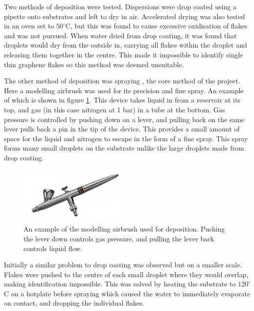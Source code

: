 \documentclass[12pt,titlepage]{article}
\begin{document}
	Two methods of deposition were tested. Dispersions were drop coated using a pipette onto substrates and left to dry in air. Accelerated drying was also tested in an oven set to $50^{\circ}$C, but this was found to cause excessive oxidisation of flakes and was not pursued. When water dried from drop coating, it was found that droplets would dry from the outside in, carrying all flakes within the droplet and releasing them together in the centre. This made it impossible to identify single thin graphene flakes so this method was deemed unsuitable.
	
	The other method of deposition was spraying \cite{Pham2010}, the core method of the project. Here a modelling airbrush was used for its precision and fine spray. An example of which is shown in figure \ref{fig:airbrush}. This device takes liquid in from a reservoir at its top, and gas (in this case nitrogen at 1 bar) in a tube at the bottom. Gas pressure is controlled by pushing down on a lever, and pulling back on the same lever pulls back a pin in the tip of the device. This provides a small amount of space for the liquid and nitrogen to escape in the form of a fine spray. This spray forms many small droplets on the substrate unlike the large droplets made from drop coating.
	
	\begin{figure}
		\centering
		\includegraphics[width=0.5\textwidth]{figures/airbrush.jpg}
		\caption[The modelling airbrush used for deposition.]{An example of the modelling airbrush used for deposition. Pushing the lever down controls gas pressure, and pulling the lever back controls liquid flow.}
		\label{fig:airbrush}
	\end{figure}
	
	Initially a similar problem to drop coating was observed but on a smaller scale. Flakes were pushed to the centre of each small droplet where they would overlap, making identification impossible. This was solved by heating the substrate to $120^{\circ}$C on a hotplate before spraying which caused the water to immediately evaporate on contact, and dropping the individual flakes.
	
\end{document}
